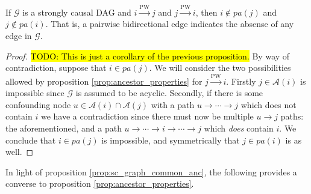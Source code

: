 \documentclass[12pt]{article}
\def\pwgc{\overset{\text{PW}}{\rightarrow}}  %
\def\gcg{\mathcal{G}}  %
\newcommand{\pa}[1]{pa(#1)}  %
\newcommand{\anc}[1]{\mathcal{A}(#1)}  %
\begin{document}
\begin{proposition}
  \label{prop:bidirectional_edge}
  If $\gcg$ is a strongly causal DAG and $i \pwgc j$ and $j \pwgc i$,
  then $i \not\in \pa{j}$ and $j \not\in \pa{i}$.  That is, a pairwise
  bidirectional edge indicates the absense of any edge in $\gcg$.
\end{proposition}
\begin{proof}
  \hl{TODO: This is just a corollary of the previous proposition.}
  By way of contradiction, suppose that $i \in \pa{j}$.  We will
  consider the two possibilities allowed by proposition
  \ref{prop:ancestor_properties} for $j \pwgc i$.  Firstly
  $j \in \anc{i}$ is impossible since $\gcg$ is assumed to be acyclic.
  Secondly, if there is some confounding node
  $u \in \anc{i} \cap \anc{j}$ with a path
  $u \rightarrow \cdots \rightarrow j$ which does not contain $i$ we
  have a contradiction since there must now be multiple
  $u \rightarrow j$ paths: the aforementioned, and a path
  $u \rightarrow \cdots \rightarrow i \rightarrow \cdots \rightarrow
  j$ which \textit{does} contain $i$.  We conclude that $i \in \pa{j}$
  is impossible, and symmetrically that $j \in \pa{i}$ is as well.
\end{proof}

In light of proposition \ref{prop:sc_graph_common_anc}, the following
provides a converse to proposition \ref{prop:ancestor_properties}.
\end{document}
